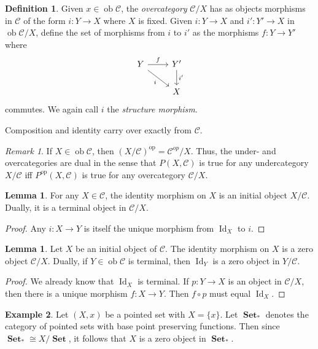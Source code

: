 \documentclass[10pt,letterpaper,cm]{nupset}
\theoremstyle{definition}
\newtheorem{definition}{Definition}
\newtheorem{exmp}[definition]{Example}
\theoremstyle{theorem}
\newtheorem{lemma}[theorem]{Lemma}
\theoremstyle{remark}
\newtheorem{remark}{Remark}
\newcommand{\1}{\mathbf{1}}
\renewcommand{\c}{\mathscr{C}}
\newcommand{\0}{\vec 0}
\DeclareMathOperator{\id}{Id}
\DeclareMathOperator{\op}{op}
\DeclareMathOperator{\ob}{ob}
\DeclareMathOperator{\set}{\mathbf{Set}}
\begin{document}
\begin{definition}
Given $x \in \ob \c$, the \textit{overcategory} ${\c}/{X}$ has as objects morphisms in $\c$ of the form $i : Y \to X$ where $X$ is fixed. Given $i:  Y \to X$ and  $i' : Y' \to X$ in $\ob {\c}/{X}$, define the set of morphisms from $i$ to $i'$ as the morphisms $f: Y \to Y'$ where
\[ \begin{tikzcd}
Y \arrow[r, "f"] \arrow[swap, dr,  " i "] & Y' \arrow[d, "i '"] \\%
 & X
\end{tikzcd}
\]
commutes. We again call $i$ the \textit{structure morphism}.

\medskip

 Composition and identity carry over exactly from $\c$.
\end{definition}

\begin{remark}
If $X \in \ob \c$, then $({X}/{\c})^{\op} = {\c^{op}}/{X}$. Thus, the under- and overcategories are dual in the sense that $P(X, \c)$ is true for any undercategory ${X}/{\c}$ iff $P^{\op}(X, \c)$ is true for any overcategory ${\c}/{X}$. 
\end{remark}

\begin{lemma}
For any $X \in \c$, the identity morphism on $X$ is an initial object ${X}/{\c}$. Dually, it is a terminal object in ${\c}/{X}$.
\end{lemma}
\begin{proof}
Any $i: X \to Y$ is itself the unique morphism from $\id_X$ to $i$.
\end{proof}

\begin{lemma}
Let $X$ be an initial object of $\c$. The identity morphism on $X$ is a zero object ${\c}/{X}$. Dually, if $Y \in \ob \c$ is terminal, then $\id_Y$ is a zero object in ${Y}/{\c}$.
\end{lemma}
\begin{proof}
We already know that $\id_X$ is terminal. If $p: Y \to X$ is an object in ${\c}/{X}$, then there is a unique morphism $f: X \to Y$. Then $f\circ p$ must equal $\id_X$.
\end{proof}

\begin{exmp}
Let $(X, x)$ be a pointed set with $X= \{x\}$. Let $\set_{\ast}$ denotes the category of pointed sets with base point preserving functions. Then since $\set_{\ast} \cong {X}/{\set}$, it follows that $X$ is a zero object in $\set_{\ast}$.
\end{exmp}
\end{document}
